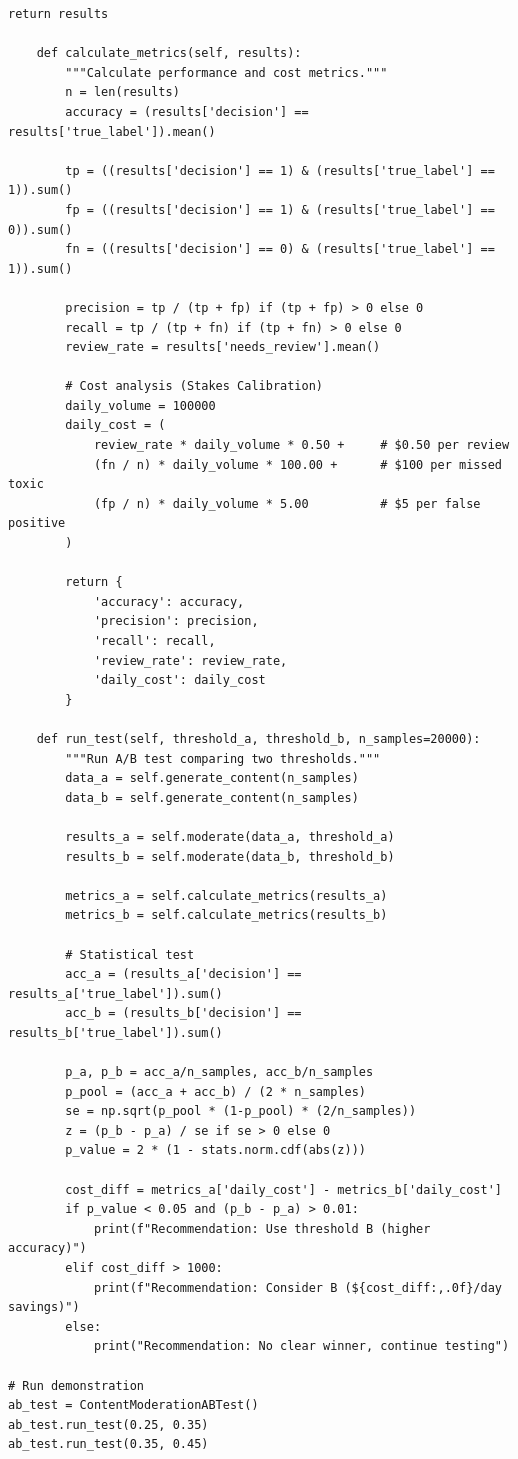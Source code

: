 \begin{lstlisting}[style=python, caption={Content moderation A/B testing framework}]
        return results

    def calculate_metrics(self, results):
        """Calculate performance and cost metrics."""
        n = len(results)
        accuracy = (results['decision'] == results['true_label']).mean()

        tp = ((results['decision'] == 1) & (results['true_label'] == 1)).sum()
        fp = ((results['decision'] == 1) & (results['true_label'] == 0)).sum()
        fn = ((results['decision'] == 0) & (results['true_label'] == 1)).sum()

        precision = tp / (tp + fp) if (tp + fp) > 0 else 0
        recall = tp / (tp + fn) if (tp + fn) > 0 else 0
        review_rate = results['needs_review'].mean()

        # Cost analysis (Stakes Calibration)
        daily_volume = 100000
        daily_cost = (
            review_rate * daily_volume * 0.50 +     # $0.50 per review
            (fn / n) * daily_volume * 100.00 +      # $100 per missed toxic
            (fp / n) * daily_volume * 5.00          # $5 per false positive
        )

        return {
            'accuracy': accuracy,
            'precision': precision,
            'recall': recall,
            'review_rate': review_rate,
            'daily_cost': daily_cost
        }

    def run_test(self, threshold_a, threshold_b, n_samples=20000):
        """Run A/B test comparing two thresholds."""
        data_a = self.generate_content(n_samples)
        data_b = self.generate_content(n_samples)

        results_a = self.moderate(data_a, threshold_a)
        results_b = self.moderate(data_b, threshold_b)

        metrics_a = self.calculate_metrics(results_a)
        metrics_b = self.calculate_metrics(results_b)

        # Statistical test
        acc_a = (results_a['decision'] == results_a['true_label']).sum()
        acc_b = (results_b['decision'] == results_b['true_label']).sum()

        p_a, p_b = acc_a/n_samples, acc_b/n_samples
        p_pool = (acc_a + acc_b) / (2 * n_samples)
        se = np.sqrt(p_pool * (1-p_pool) * (2/n_samples))
        z = (p_b - p_a) / se if se > 0 else 0
        p_value = 2 * (1 - stats.norm.cdf(abs(z)))

        cost_diff = metrics_a['daily_cost'] - metrics_b['daily_cost']
        if p_value < 0.05 and (p_b - p_a) > 0.01:
            print(f"Recommendation: Use threshold B (higher accuracy)")
        elif cost_diff > 1000:
            print(f"Recommendation: Consider B (${cost_diff:,.0f}/day savings)")
        else:
            print("Recommendation: No clear winner, continue testing")

# Run demonstration
ab_test = ContentModerationABTest()
ab_test.run_test(0.25, 0.35)
ab_test.run_test(0.35, 0.45)
\end{lstlisting}

